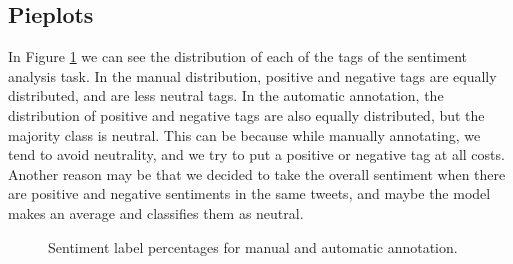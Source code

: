 \documentclass[11pt,a4paper]{article}
\begin{document}
\subsection{Pieplots}

In Figure \ref{fig:pieplots_sentiment} we can see the distribution of each of the tags of the sentiment analysis task. In the manual distribution, positive and negative tags are equally distributed, and are less neutral tags. In the automatic annotation, the distribution of positive and negative tags are also equally distributed, but the majority class is neutral. This can be because while manually annotating, we tend to avoid neutrality, and we try to put a positive or negative tag at all costs. Another reason may be that we decided to take the overall sentiment when there are positive and negative sentiments in the same tweets, and maybe the model makes an average and classifies them as neutral.

\begin{figure}[ht]
    \centering
    \caption{Sentiment label percentages for manual and automatic annotation.}
    \label{fig:pieplots_sentiment}
\end{figure}
\end{document}
